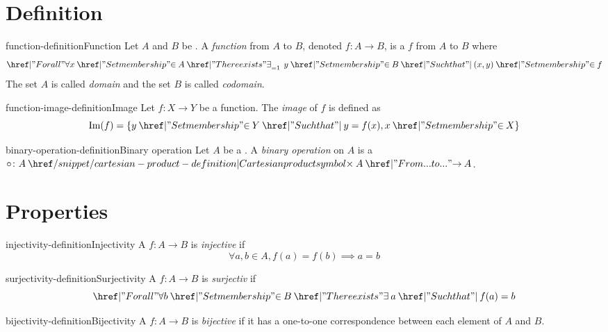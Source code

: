 \documentclass[preview]{standalone}
\begin{document}
\genpage

\section{Definition}

\begin{snippetdefinition}{function-definition}{Function}
    Let \(A\) and \(B\) be \set[sets].
    A \textit{function} from \(A\) to \(B\), denoted \(f\colon A\to B\),
    is a \binrelation \(f\) from \(A\) to \(B\) where
    \[
        \forall x \in A \exists_{=1} \, y \in B \suchthat (x,y) \in f
    \]
    The set \(A\) is called \textit{domain} and the set \(B\) is called \textit{codomain}.
\end{snippetdefinition}

\begin{snippetdefinition}{function-image-definition}{Image}
    Let \(f\colon X\to Y\) be a function.
    The \textit{image} of \(f\) is defined as
    \[ \text{Im}(f) = \{y \in Y \suchthat y=f(x), x \in X \} \]
\end{snippetdefinition}

\begin{snippetdefinition}{binary-operation-definition}{Binary operation}
    Let \(A\) be a \set.
    A \textit{binary operation} on \(A\)
    is a \function \(\circ\colon A \cartesianprod A \to A\).
\end{snippetdefinition}

\section{Properties}

\begin{snippetdefinition}{injectivity-definition}{Injectivity}
    A \function \(f \colon A\to B\) is \textit{injective} if
    \[
        \forall a,b \in A, f(a) = f(b) \implies a = b
    \]
\end{snippetdefinition}

\begin{snippetdefinition}{surjectivity-definition}{Surjectivity}
    A \function \(f \colon A\to B\) is \textit{surjectiv} if
    \[
        \forall b \in B \exists a \suchthat f(a)=b
    \]
\end{snippetdefinition}

\begin{snippetdefinition}{bijectivity-definition}{Bijectivity}
    A \function \(f \colon A\to B\) is \textit{bijective} if
    it has a one-to-one correspondence between each element of \(A\) and  \(B\).
\end{snippetdefinition}
\end{document}
